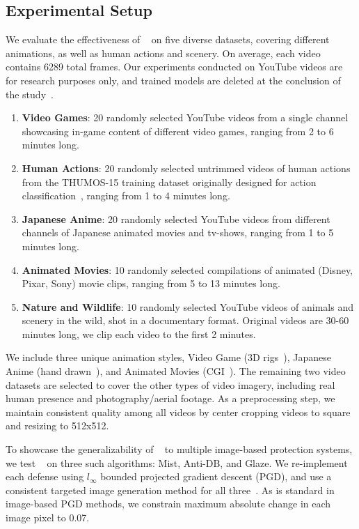 \subsection{Experimental Setup} 
\label{sec:setup}
We evaluate the effectiveness of \system~ on five diverse datasets, covering
different animations, as well as human actions and scenery. On average, each
video contains 6289 total frames. Our experiments conducted on YouTube videos
are for research purposes only, and trained models are deleted at the
conclusion of the study~\cite{fairuse}.
\begin{enumerate}
\item \textbf{Video Games}: 20 randomly selected YouTube videos from a single
  channel showcasing in-game content of different video games, ranging from 2
  to 6 minutes long.
\item \textbf{Human Actions}: 20 randomly selected untrimmed videos of human
  actions from the THUMOS-15 training dataset originally designed for action
  classification~\cite{Idrees_2017}, ranging from 1 to 4 minutes long.
\item \textbf{Japanese Anime}: 20 randomly selected YouTube videos from
  different channels of Japanese animated movies and tv-shows, ranging from 1
  to 5 minutes long.
\item \textbf{Animated Movies}: 10 randomly selected compilations of animated
  (Disney, Pixar, Sony) movie clips, ranging from 5 to 13 minutes long.
\item \textbf{Nature and Wildlife}: 10 randomly selected YouTube videos of
  animals and scenery in the wild, shot in a documentary format. Original
  videos are 30-60 minutes long, we clip each video to the first 2 minutes.
\end{enumerate}

We include three unique animation styles, Video Game (3D
rigs~\cite{videogameanimation}), Japanese Anime (hand
drawn~\cite{animeanimation}), and Animated Movies
(CGI~\cite{amoviesanimation}). The remaining two video datasets are selected
to cover the other types of video imagery, including real human presence
and photography/aerial footage. As a preprocessing step, we maintain
consistent quality among all videos by center cropping videos to square and
resizing to 512x512.  

  To showcase the generalizability of \system~
to multiple image-based protection systems, we test \system~ on three such
algorithms: Mist, Anti-DB, and Glaze. We re-implement each defense using
$l_{\infty}$ bounded projected gradient descent (PGD), and use a consistent
targeted image generation method for all three~\cite{shan2023glaze}. As is
standard in image-based PGD methods, we constrain maximum absolute change
in each image pixel to 0.07.

